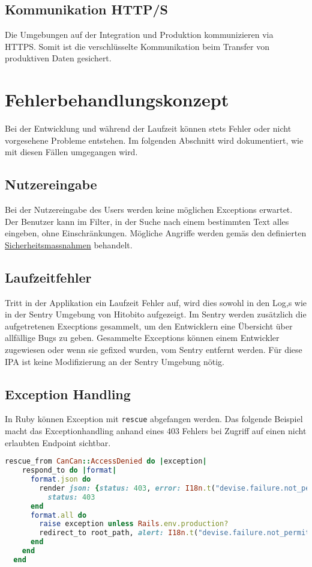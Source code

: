 \subsection{Kommunikation HTTP/S}
Die Umgebungen auf der Integration und Produktion kommunizieren via HTTPS. Somit ist
die verschlüsselte Kommunikation beim Transfer von produktiven Daten gesichert.

\section{Fehlerbehandlungskonzept}
Bei der Entwicklung und während der Laufzeit können stets Fehler oder nicht vorgesehene Probleme entstehen.
Im folgenden Abschnitt wird dokumentiert, wie mit diesen Fällen umgegangen wird.

\subsection{Nutzereingabe}
Bei der Nutzereingabe des Users werden keine möglichen Exceptions erwartet. Der Benutzer kann im Filter, in der Suche nach einem
bestimmten Text alles eingeben, ohne Einschränkungen. Mögliche Angriffe werden gemäs den definierten \hyperref[sec1]{\color{blue}Sicherheitsmassnahmen} behandelt. 

\subsection{Laufzeitfehler}
Tritt in der Applikation ein Laufzeit Fehler auf, wird dies sowohl in den Log,s wie in der Sentry
Umgebung von Hitobito aufgezeigt. Im Sentry werden zusätzlich die aufgetretenen Execptions gesammelt, um 
den Entwicklern eine Übersicht über allfällige Bugs zu geben. Gesammelte Exceptions können einem Entwickler
zugewiesen oder wenn sie gefixed wurden, vom Sentry entfernt werden. Für diese IPA ist keine Modifizierung an der 
Sentry Umgebung nötig.

\subsection{Exception Handling}
In Ruby können Exception mit \texttt{rescue} abgefangen werden. Das folgende Beispiel macht das Exceptionhandling anhand eines 403 Fehlers bei
Zugriff auf einen nicht erlaubten Endpoint sichtbar.

\begin{lstlisting}[language=Ruby]
   rescue_from CanCan::AccessDenied do |exception|
    respond_to do |format|
      format.json do
        render json: {status: 403, error: I18n.t("devise.failure.not_permitted_to_view_page")},
          status: 403
      end
      format.all do
        raise exception unless Rails.env.production?
        redirect_to root_path, alert: I18n.t("devise.failure.not_permitted_to_view_page")
      end
    end
  end
\end{lstlisting}

